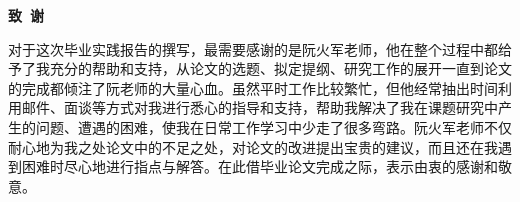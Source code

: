 \cleardoublepage{}
\begin{center}
    \bfseries {} 致~谢
\end{center}

对于这次毕业实践报告的撰写，最需要感谢的是阮火军老师，他在整个过程中都给予了我充分的帮助和支持，从论文的选题、拟定提纲、研究工作的展开一直到论文的完成都倾注了阮老师的大量心血。虽然平时工作比较繁忙，但他经常抽出时间利用邮件、面谈等方式对我进行悉心的指导和支持，帮助我解决了我在课题研究中产生的问题、遭遇的困难，使我在日常工作学习中少走了很多弯路。阮火军老师不仅耐心地为我之处论文中的不足之处，对论文的改进提出宝贵的建议，而且还在我遇到困难时尽心地进行指点与解答。在此借毕业论文完成之际，表示由衷的感谢和敬意。



